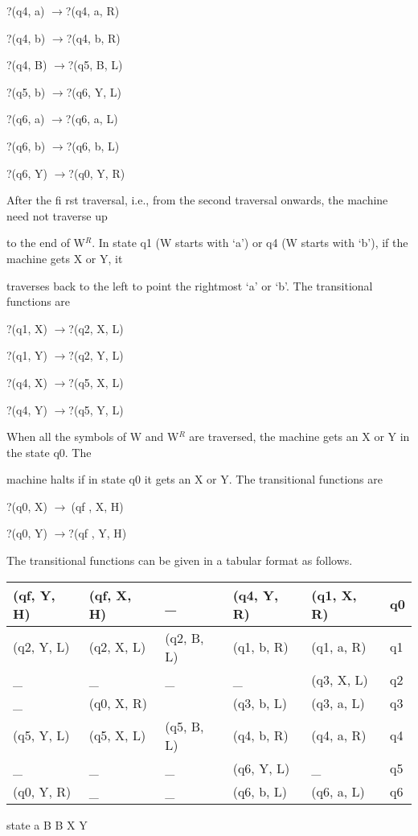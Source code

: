 \documentclass{article} %
\begin{document}
\noindent ?(q4, a) $\to $?(q4, a, R)

\noindent ?(q4, b) $\to $?(q4, b, R)

\noindent ?(q4, B) $\to $?(q5, B, L)

\noindent ?(q5, b) $\to $?(q6, Y, L)

\noindent ?(q6, a) $\to $?(q6, a, L)

\noindent ?(q6, b) $\to $?(q6, b, L)

\noindent ?(q6, Y) $\to $?(q0, Y, R)

\noindent After the fi rst traversal, i.e., from the second traversal onwards, the machine need not traverse up

\noindent to the end of W${}^{R}$. In state q1 (W starts with `a') or q4 (W starts with `b'), if the machine gets X or Y, it

\noindent traverses back to the left to point the rightmost `a' or `b'. The transitional functions are

\noindent ?(q1, X) $\to $?(q2, X, L)

\noindent ?(q1, Y) $\to $?(q2, Y, L)

\noindent ?(q4, X) $\to $?(q5, X, L)

\noindent ?(q4, Y) $\to $?(q5, Y, L)

\noindent When all the symbols of W and W${}^{R}$ are traversed, the machine gets an X or Y in the state q0. The

\noindent machine halts if in state q0 it gets an X or Y. The transitional functions are

\noindent ?(q0, X) $\to \ $(qf , X, H)

\noindent ?(q0, Y) $\to $?(qf , Y, H)

\noindent The transitional functions can be given in a tabular format as follows.

\noindent 

\begin{tabular}{|p{0.7in}|p{0.7in}|p{0.7in}|p{0.7in}|p{0.7in}|p{0.7in}|} \hline 
(qf, Y, H) & (qf, X, H) & \_ & (q4, Y, R) & (q1, X, R) & q0 \\ \hline 
(q2, Y, L) & (q2, X, L) & (q2, B, L) & (q1, b, R) & (q1, a, R) & q1 \\ \hline 
\_ & \_ & \_ & \_ & (q3, X, L) & q2 \\ \hline 
\_ & (q0, X, R) &  & (q3, b, L) & (q3, a, L) & q3 \\ \hline 
(q5, Y, L) & (q5, X, L) & (q5, B, L) & (q4, b, R) & (q4, a, R) & q4 \\ \hline 
\_ & \_ & \_ & (q6, Y, L) & \_ & q5 \\ \hline 
(q0, Y, R) & \_ & \_ & (q6, b, L) & (q6, a, L) & q6 \\ \hline 
\end{tabular}

             state                       a                           B                             B                            X                           Y

\noindent    

\noindent 

\noindent 

\noindent 

\noindent 
\end{document}
